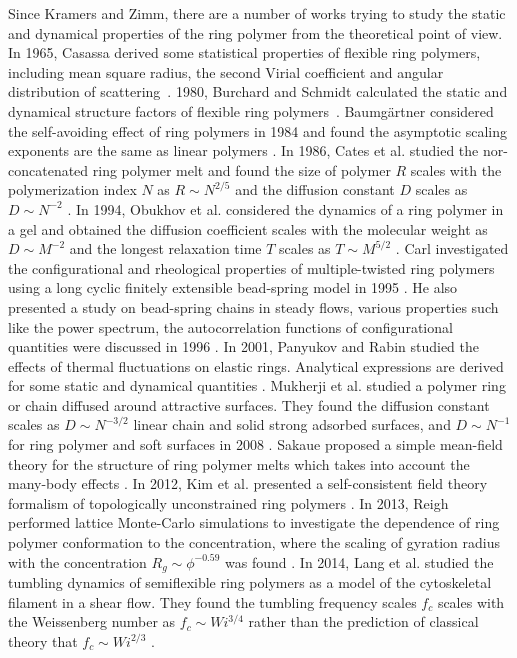 Since Kramers and Zimm, there are a number of works trying to study the static and dynamical properties of the ring polymer from the theoretical point of view.
In 1965, Casassa derived some statistical properties of flexible ring polymers, including mean square radius, the second Virial coefficient and angular distribution of scattering~\cite{Casassa1965}. 1980, Burchard and Schmidt calculated the static and dynamical structure factors of flexible ring polymers~\cite{Burchard1980}. Baumg\"{a}rtner considered the self-avoiding effect of ring polymers in 1984 and found the asymptotic scaling exponents are the same as linear polymers \cite{Baumgartner1982a}. In 1986, Cates et al. studied the nor-concatenated ring polymer melt and found the size of polymer $R$ scales with the polymerization index $N$ as $R\sim N^{2/5}$ and the diffusion constant $D$ scales as $D\sim N^{-2}$ \cite{Cates1986}.  In 1994, Obukhov et al. considered the dynamics of a ring polymer in a gel and obtained the diffusion coefficient scales with the molecular weight as $D\sim M^{-2}$ and the longest relaxation time $T$ scales as $T\sim M^{5/2}$ \cite{Obukhov1994}. Carl investigated the configurational and rheological properties of multiple-twisted ring polymers using a long cyclic finitely extensible bead-spring model in 1995 \cite{Carl1995}. He also presented a study on bead-spring chains in steady flows, various properties such like the power spectrum, the autocorrelation functions of configurational quantities were discussed in 1996 \cite{Carl1996}.
In 2001, Panyukov and Rabin studied the effects of thermal fluctuations on elastic rings. Analytical expressions are derived for some static and dynamical quantities \cite{Panyukov2001}.  Mukherji et al. studied a polymer ring or chain diffused around attractive surfaces. They found the diffusion constant scales as $D \sim N^{-3/2}$ linear chain and solid strong adsorbed surfaces, and $D\sim N^{-1}$ for ring polymer and soft surfaces in 2008 \cite{Mukherji2008}. Sakaue proposed a simple mean-field theory for the structure of ring polymer melts which takes into account the many-body effects \cite{Sakaue2011,Sakaue2012}. In 2012, Kim et al. presented a self-consistent field theory formalism of topologically unconstrained ring polymers \cite{Kim2012}.  In 2013, Reigh performed lattice Monte-Carlo simulations to investigate the dependence of ring polymer conformation to the concentration, where the scaling of gyration radius with the concentration $R_g \sim \phi^{-0.59}$ was found \cite{Reigh2013}. In 2014, Lang et al. studied the tumbling dynamics of semiflexible ring polymers as a model of the cytoskeletal filament in a shear flow. They found the tumbling frequency scales $f_c$ scales with the Weissenberg number as $f_c \sim Wi^{3/4}$ rather than the prediction of classical theory that $f_c \sim Wi^{2/3}$ \cite{Lang2014b}.


